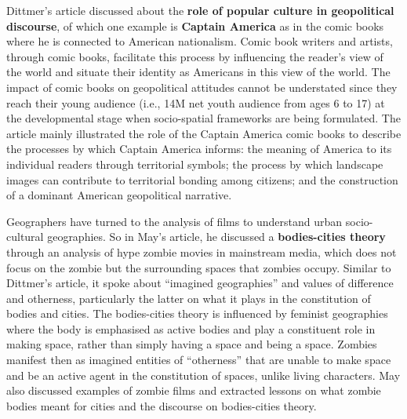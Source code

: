 \documentclass[a4paper, 10.5pt]{article} %
\begin{document}
Dittmer's article discussed about the \textbf{role of popular culture in geopolitical discourse}, of which one example is \textbf{Captain America} as in the comic books where he is connected to American nationalism. Comic book writers and artists, through comic books, facilitate this process by influencing the reader's view of the world and situate their identity as Americans in this view of the world. The impact of comic books on geopolitical attitudes cannot be understated since they reach their young audience (i.e., 14M net youth audience from ages 6 to 17) at the developmental stage when socio-spatial frameworks are being formulated. The article mainly illustrated the role of the Captain America comic books to describe the processes by which Captain America informs: the meaning of America to its individual readers through territorial symbols; the process by which landscape images can contribute to territorial bonding among citizens; and the construction of a dominant American geopolitical narrative.

Geographers have turned to the analysis of films to understand urban socio-cultural geographies. So in May's article, he discussed a \textbf{bodies-cities theory} through an analysis of hype zombie movies in mainstream media, which does not focus on the zombie but the surrounding spaces that zombies occupy. Similar to Dittmer's article, it spoke about \enquote{imagined geographies} and values of difference and otherness, particularly the latter on what it plays in the constitution of bodies and cities. The bodies-cities theory is influenced by feminist geographies where the body is emphasised as active bodies and play a constituent role in making space, rather than simply having a space and being a space. Zombies manifest then as imagined entities of \enquote{otherness} that are unable to make space and be an active agent in the constitution of spaces, unlike living characters. May also discussed examples of zombie films and extracted lessons on what zombie bodies meant for cities and the discourse on bodies-cities theory.
\end{document}

